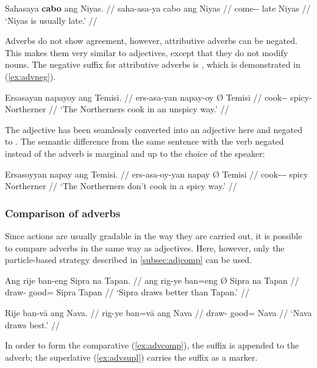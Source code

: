 \a\label{ex:attradv}\begingl
	\gla Sahasaya \textbf{cabo} ang Niyas. //
	\glb saha-asa-ya cabo ang Niyas //
	\glc come-\Hab{}-\TsgM{} late \Aarg{} Niyas //
	\glft `Niyas is usually late.' //
\endgl

\xe

Adverbs do not show agreement, however, attributive adverbs can be negated.
This makes them very similar to adjectives, except that they do not modify
nouns. The negative suffix for attributive adverbs is , which is
demonstrated in (\ref{ex:advneg}).

\ex\label{ex:advneg}\begingl
	\gla Ersasayan napayoy ang Temisi. //
	\glb ers-asa-yan napay-oy Ø Temisi //
	\glc cook-\Hab{}-\TplM{} spicy-\Neg{} \Aarg{} Northerner //
	\glft `The Northerners cook in an unspicy way.' //
\endgl\xe

The adjective  has been seamlessly converted into an
adjective here and negated to . The semantic
difference from the same sentence with the verb negated instead of the adverb
is marginal and up to the choice of the speaker:

\ex\label{ex:advneg_2}\begingl
	\gla Ersasoyyan napay ang Temisi. //
	\glb ers-asa-oy-yan napay Ø Temisi //
	\glc cook-\Hab{}-\Neg{}-\TplM{} spicy \Aarg{} Northerner //
	\glft `The Northerners don't cook in a spicy way.' //
\endgl\xe

\subsubsection{Comparison of adverbs}

Since actions are usually gradable in the way they are carried out, it is 
possible to compare adverbs in the same way as adjectives. Here, however, only 
the particle-based strategy described in \autoref{subsec:adjcomp} 
can be used.

\pex
\a\label{ex:advcomp}\begingl
	\gla Ang rije ban-eng {} Sipra na Tapan. //
	\glb ang rig-ye ban=eng Ø Sipra na Tapan //
	\glc \AgtT{} draw-\TsgF{} good=\Comp{} \Top{} Sipra \Gen{} Tapan //
	\glft `Sipra draws better than Tapan.' //
\endgl

\a\label{ex:advsupl}\begingl
	\gla Rije ban-vā ang Nava. //
	\glb rig-ye ban=vā ang Nava //
	\glc draw-\TsgF{} good=\Supl{} \Aarg{} Nava //
	\glft `Nava draws best.' //
\endgl
\xe


In order to form the comparative (\ref{ex:advcomp}), the suffix 
 is appended to the adverb; the superlative (\ref{ex:advsupl})
carries the suffix  as a marker.

